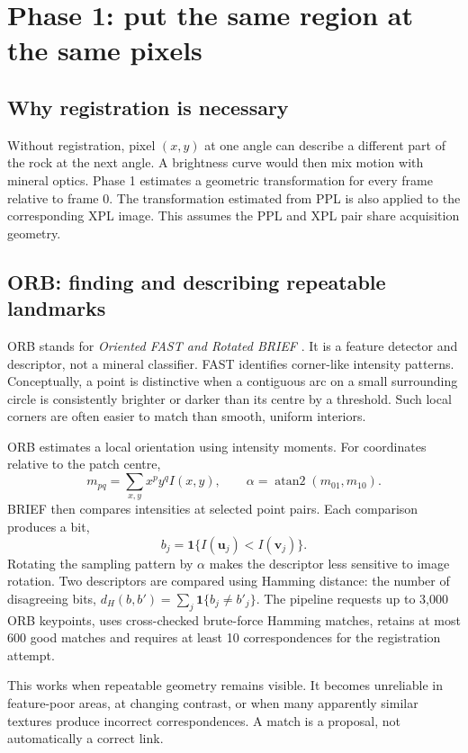 \section{Phase 1: put the same region at the same pixels}
\subsection{Why registration is necessary}
Without registration, pixel $(x,y)$ at one angle can describe a different part of the rock at the next angle. A brightness curve would then mix motion with mineral optics. Phase 1 estimates a geometric transformation for every frame relative to frame 0. The transformation estimated from PPL is also applied to the corresponding XPL image. This assumes the PPL and XPL pair share acquisition geometry.

\subsection{ORB: finding and describing repeatable landmarks}
ORB stands for \emph{Oriented FAST and Rotated BRIEF} \cite{orb}. It is a feature detector and descriptor, not a mineral classifier. FAST identifies corner-like intensity patterns. Conceptually, a point is distinctive when a contiguous arc on a small surrounding circle is consistently brighter or darker than its centre by a threshold. Such local corners are often easier to match than smooth, uniform interiors.

ORB estimates a local orientation using intensity moments. For coordinates relative to the patch centre,
\begin{equation}
m_{pq}=\sum_{x,y}x^p y^q I(x,y),\qquad
\alpha=\operatorname{atan2}(m_{01},m_{10}).
\end{equation}
BRIEF then compares intensities at selected point pairs. Each comparison produces a bit,
\begin{equation}
b_j=\mathbf{1}\{I(\mathbf u_j)<I(\mathbf v_j)\}.
\end{equation}
Rotating the sampling pattern by $\alpha$ makes the descriptor less sensitive to image rotation. Two descriptors are compared using Hamming distance: the number of disagreeing bits, $d_H(b,b')=\sum_j\mathbf{1}\{b_j\ne b'_j\}$. The pipeline requests up to 3,000 ORB keypoints, uses cross-checked brute-force Hamming matches, retains at most 600 good matches and requires at least 10 correspondences for the registration attempt.

This works when repeatable geometry remains visible. It becomes unreliable in feature-poor areas, at changing contrast, or when many apparently similar textures produce incorrect correspondences. A match is a proposal, not automatically a correct link.

